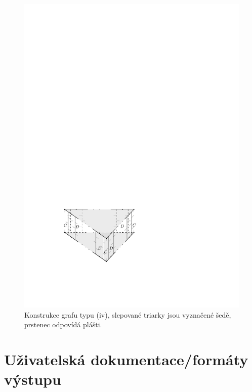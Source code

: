 \begin{figure}[h!]\centering
\includegraphics[width = \textwidth]{../img/iv-construction}
\caption{Konstrukce grafu typu (iv), slepované triarky jsou vyznačené šedě, prstenec odpovídá plášti.}
\label{obr03:konstrukceiv}
\end{figure}



\section{Uživatelská dokumentace/formáty výstupu}


